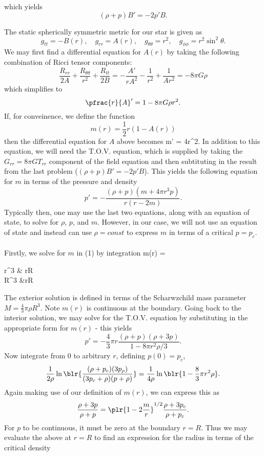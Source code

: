 \documentclass[10pt,letterpaper]{article}
\begin{document}
\ea
which yields
\[
	(\rho+p)B' = -2p'B.
\]
\newpage
\item
The static spherically symmetric metric for our star is given as 
\[
	g_{tt} = -B(r),\quad g_{rr} = A(r),\quad  g_{\theta\theta} = r^2,\quad g_{\phi\phi} = r^2\sin^2\theta.
\]
We may first find a differential equation for $A(r)$ by taking the following combination of Ricci tensor components:
\[
	\frac{R_{rr}}{2A}+\frac{R_{\theta\theta}}{r^2}+\frac{R_{tt}}{2B} = -\frac{A'}{rA^2}-\frac{1}{r^2}+\frac{1}{Ar^2} = -8\pi G\rho
\]
which simplifies to
\[
	\pfrac{r}{A}'=1-8\pi G\rho r^2.
\]
If, for conveinence, we define the function
\[
	m(r) = \frac12 r(1-A(r))
\]
then the differential equation for $A$ above becomes
\be
	m' = 4\pi r^2\rho.
\ee
In addition to this equation, we will need the T.O.V. equation, which is supplied by taking the $G_{rr} = 8\pi GT_{rr}$ component of the field equation and then subtituting in the result from the last problem ($(\rho+p)B' = -2p'B$). This yields the following equation for $m$ in terms of the pressure and density
\[
	p' = -\frac{(\rho+p)(m+4\pi r^3 p)}{r(r-2m)}.
\]
Typically then, one may use the last two equations, along with an equation of state, to solve for $\rho$, $p$, and $m$. However, in our case, we will not use an equation of state and instead can use $\rho = const$ to express $m$ in terms of a critical $p=p_c$. 
\\ \\
Firstly, we solve for $m$ in (1) by integration
\be
	m(r) = \begin{cases}\pi \rho r^3 & r\le R\\
	\pi \rho R^3 &r\ge R \end{cases} 
\ee
The exterior solution is defined in terms of the Scharwzchild mass parameter $M = \frac{4}{3}\pi \rho R^3$. Note $m(r)$ is continuous at the boundary. Going back to the interior solution, we may solve for the T.O.V. equation by substituting in the appropriate form for $m(r)$ - this yields
\[
	p' = -\frac43\pi r\frac{(\rho+p)(\rho+3p)}{1-8\pi r^2\rho/3}.
\]
Now integrate from $0$ to arbitrary $r$, defining $p(0) = p_c$,
\[
	\frac{1}{2\rho}\ln \blr{ \frac{(\rho+p_c)(3p_\rho)}{(3p_c+\rho)(p+\rho)}} = \frac{1}{4\rho}\ln\blr{
	1-\frac83 \pi r^2\rho}.
\]
Again making use of our definition of $m(r)$, we can express this as 
\[
	\frac{\rho+3p}{\rho+p} = \plr{ 1-2\frac mr}^{1/2}\frac{\rho+3p_c}{\rho+p_c}.
\]
For $p$ to be continuous, it must be zero at the boundary $r=R$. Thus we may evaluate the above at $r=R$ to find an expression for the radius in terms of the critical density
\end{document}
